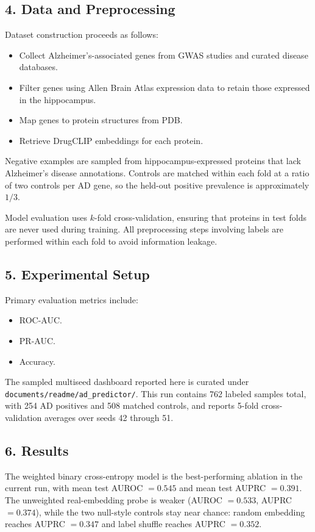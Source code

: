 \documentclass{article}
\begin{document}
\subsection*{4. Data and Preprocessing}
Dataset construction proceeds as follows:
\begin{itemize}
    \item Collect Alzheimer's-associated genes from GWAS studies \cite{disgenet2023,lambert2013} and curated disease databases.
    \item Filter genes using Allen Brain Atlas expression data to retain those expressed in the hippocampus.
    \item Map genes to protein structures from PDB.
    \item Retrieve DrugCLIP embeddings for each protein.
\end{itemize}

Negative examples are sampled from hippocampus-expressed proteins that lack Alzheimer's disease annotations. Controls are matched within each fold at a ratio of two controls per AD gene, so the held-out positive prevalence is approximately $1/3$.

Model evaluation uses $k$-fold cross-validation, ensuring that proteins in test folds are never used during training. All preprocessing steps involving labels are performed within each fold to avoid information leakage.

\subsection*{5. Experimental Setup}
Primary evaluation metrics include:
\begin{itemize}
    \item ROC-AUC.
    \item PR-AUC.
    \item Accuracy.
\end{itemize}

The sampled multiseed dashboard reported here is curated under \texttt{documents/readme/ad\_predictor/}. This run contains 762 labeled samples total, with 254 AD positives and 508 matched controls, and reports 5-fold cross-validation averages over seeds 42 through 51.

\subsection*{6. Results}
The weighted binary cross-entropy model is the best-performing ablation in the current run, with mean test AUROC $= 0.545$ and mean test AUPRC $= 0.391$. The unweighted real-embedding probe is weaker (AUROC $= 0.533$, AUPRC $= 0.374$), while the two null-style controls stay near chance: random embedding reaches AUPRC $= 0.347$ and label shuffle reaches AUPRC $= 0.352$.
\end{document}
